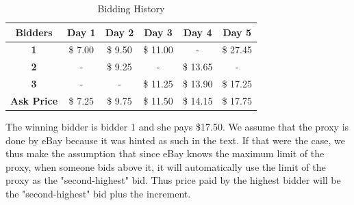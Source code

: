 \documentclass[]{article}
\begin{document}
\begin{table}[htbp]
	\centering
	\caption{Bidding History}
	\begin{tabular}{c|ccccc}
		\rowcolor[rgb]{ 0,  0,  0} \textcolor[rgb]{ 1,  1,  1}{\textbf{Bidders}} & \textcolor[rgb]{ 1,  1,  1}{\textbf{Day 1}} & \textcolor[rgb]{ 1,  1,  1}{\textbf{Day 2}} & \textcolor[rgb]{ 1,  1,  1}{\textbf{Day 3}} & \textcolor[rgb]{ 1,  1,  1}{\textbf{Day 4}} & \textcolor[rgb]{ 1,  1,  1}{\textbf{Day 5}} \\
		\midrule
		\rowcolor[rgb]{ .184,  .459,  .71} \textcolor[rgb]{ 1,  1,  1}{\textbf{1}} & \textcolor[rgb]{ 1,  1,  1}{ \$        7.00 } & \textcolor[rgb]{ 1,  1,  1}{ \$        9.50 } & \textcolor[rgb]{ 1,  1,  1}{ \$     11.00 } & \textcolor[rgb]{ 1,  1,  1}{ - } & \textcolor[rgb]{ 1,  1,  1}{ \$     27.45 } \\
		\rowcolor[rgb]{ .184,  .459,  .71} \textcolor[rgb]{ 1,  1,  1}{\textbf{2}} & \cellcolor[rgb]{ .357,  .608,  .835} \textcolor[rgb]{ 1,  1,  1}{ - } & \textcolor[rgb]{ 1,  1,  1}{ \$        9.25 } & \cellcolor[rgb]{ .357,  .608,  .835} \textcolor[rgb]{ 1,  1,  1}{ - } & \textcolor[rgb]{ 1,  1,  1}{ \$     13.65 } & \cellcolor[rgb]{ .357,  .608,  .835} \textcolor[rgb]{ 1,  1,  1}{ - } \\
		\rowcolor[rgb]{ .184,  .459,  .71} \textcolor[rgb]{ 1,  1,  1}{\textbf{3}} & \textcolor[rgb]{ 1,  1,  1}{ - } & \textcolor[rgb]{ 1,  1,  1}{ - } & \textcolor[rgb]{ 1,  1,  1}{ \$     11.25 } & \textcolor[rgb]{ 1,  1,  1}{ \$     13.90 } & \textcolor[rgb]{ 1,  1,  1}{ \$     17.25 } \\
		\rowcolor[rgb]{ .184,  .459,  .71} \textcolor[rgb]{ 1,  1,  1}{\textbf{Ask Price}} & \cellcolor[rgb]{ .357,  .608,  .835} \textcolor[rgb]{ 1,  1,  1}{ \$        7.25 } & \textcolor[rgb]{ 1,  1,  1}{ \$        9.75 } & \cellcolor[rgb]{ .357,  .608,  .835} \textcolor[rgb]{ 1,  1,  1}{ \$     11.50 } & \textcolor[rgb]{ 1,  1,  1}{ \$     14.15 } & \cellcolor[rgb]{ .357,  .608,  .835} \textcolor[rgb]{ 1,  1,  1}{ \$     17.75 } \\
	\end{tabular}
	\label{Q2.1 Bidding History}
\end{table}

The winning bidder is bidder 1 and she pays \$17.50. We assume that the proxy is done by eBay because it was hinted as such in the text. If that were the case, we thus make the assumption that since eBay knows the maximum limit of the proxy, when someone bids above it, it will automatically use the limit of the proxy as the "second-highest" bid. Thus price paid by the highest bidder will be the "second-highest" bid plus the increment.
\end{document}
